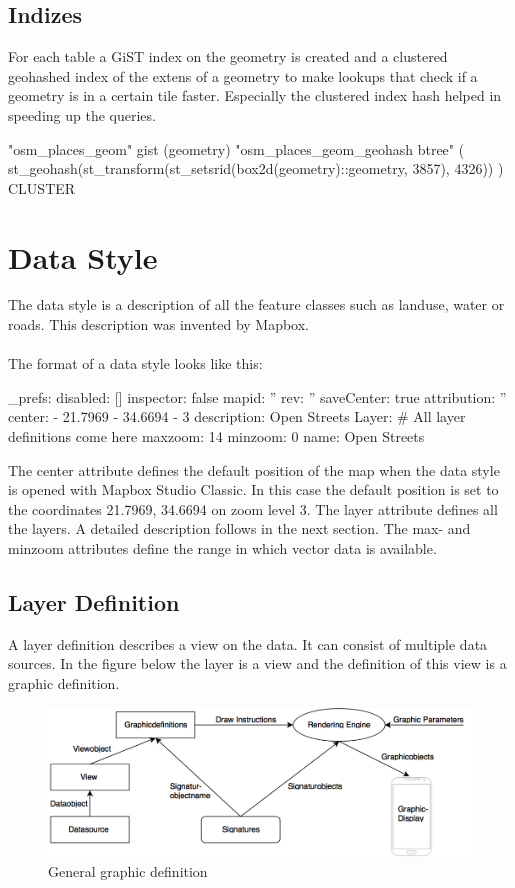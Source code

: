 \subsection{Indizes}

For each table a GiST\cite{87_postgresql.org_2015} index on the geometry
is created and a clustered geohashed index of the extens of a geometry\cite{88_postgis.net_2015} to make lookups that check if a geometry is in a certain tile faster. Especially the clustered index hash helped in speeding up the queries.

\begin{sqlcode}
"osm_places_geom" gist (geometry)
"osm_places_geom_geohash btree" (
    st_geohash(st_transform(st_setsrid(box2d(geometry)::geometry, 3857), 4326))
) CLUSTER
\end{sqlcode}

\section{Data Style}\label{data_style}

The data style is a description of all the feature classes such as landuse, water or roads. This description was invented by Mapbox.
\\\\
The format of a data style looks like this:
\begin{yamlcode}
_prefs: 
  disabled: []
  inspector: false
  mapid: ''
  rev: ''
  saveCenter: true
attribution: ''
center: 
  - 21.7969
  - 34.6694
  - 3
description: Open Streets
Layer: 
    # All layer definitions come here
maxzoom: 14
minzoom: 0
name: Open Streets
\end{yamlcode}
The center attribute defines the default position of the map when the data style is opened with Mapbox Studio Classic. In this case the default position is set to the coordinates 21.7969, 34.6694 on zoom level 3. The layer attribute defines all the layers. A detailed description follows in the next section. The max- and minzoom attributes define the range in which vector data is available.
\newpage
\subsection{Layer Definition}\label{layer_definition}
A layer definition describes a view on the data. It can consist of multiple data sources. In the figure below the layer is a view and the definition of this view is a graphic definition.

\begin{figure}[H]
\centering
  \includegraphics[width=1\textwidth]{images/graphic_definition.png}
  \caption{General graphic definition}
\end{figure}

